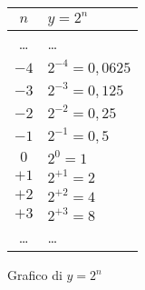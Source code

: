 \begin{figure}[h]
 \centering
 \begin{minipage}[]{.48\textwidth}
  \begin{center}
   \begin{tabular}{c|l}
    $n$   & $y=2^n$ \\
    \hline
    \dots & \dots \\
    $-4$ & $2^{-4} = 0,0625$ \\
    $-3$ & $2^{-3} = 0,125$ \\
    $-2$ & $2^{-2} = 0,25$ \\
    $-1$ & $2^{-1} = 0,5$ \\
    $0$ & $2^{0} = 1$ \\
    $+1$ & $2^{+1} = 2$ \\
    $+2$ & $2^{+2} = 4$ \\
    $+3$ & $2^{+3} = 8$ \\
    \dots & \dots \\
   \end{tabular}
  \end{center}
 \end{minipage}
\begin{minipage}[]{.48\textwidth}
\begin{center}
\begin{inaccessibleblock}
  \puntia
  \caption{Grafico di $y = 2^n$} \label{fig:potdue0}
\end{inaccessibleblock}
\end{center}
\end{minipage}
\end{figure}


